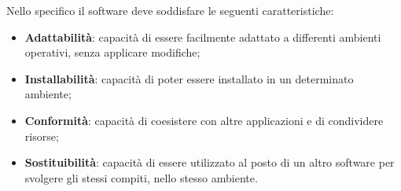\begin{itemize}
		Nello specifico il software deve soddisfare le seguenti caratteristiche:
		\begin{itemize}
			\item \textbf{Adattabilità}: capacità di essere facilmente adattato a differenti ambienti operativi, senza applicare modifiche;
			\item \textbf{Installabilità}: capacità di poter essere installato in un determinato ambiente;
			\item \textbf{Conformità}: capacità di coesistere con altre applicazioni e di condividere risorse;
			\item \textbf{Sostituibilità}: capacità di essere utilizzato al posto di un altro software per svolgere gli stessi compiti, nello stesso ambiente.
		\end{itemize}
	\end{itemize}
